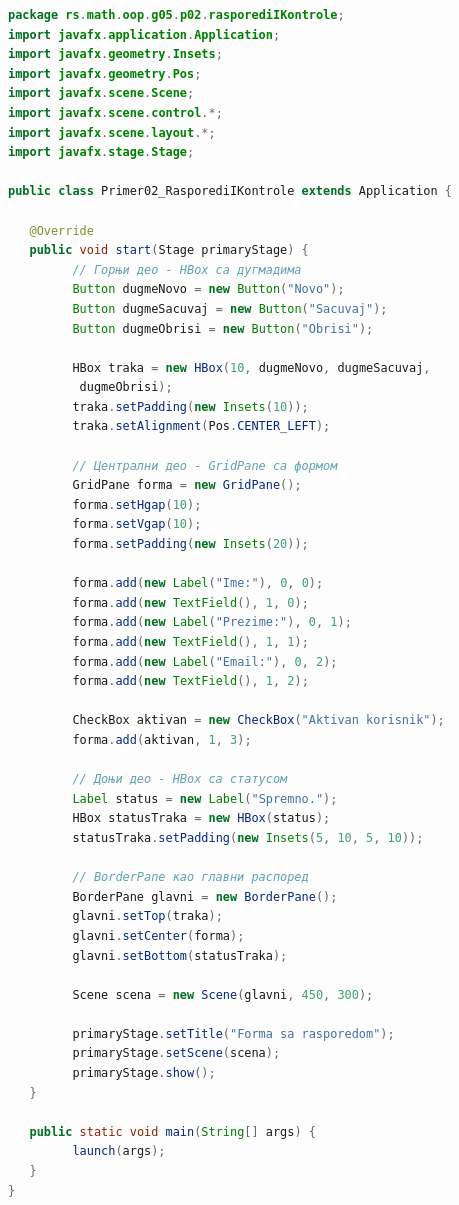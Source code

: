 \begin{lstlisting}[language=Java]
package rs.math.oop.g05.p02.rasporediIKontrole;
import javafx.application.Application;
import javafx.geometry.Insets;
import javafx.geometry.Pos;
import javafx.scene.Scene;
import javafx.scene.control.*;
import javafx.scene.layout.*;
import javafx.stage.Stage;
 
public class Primer02_RasporediIKontrole extends Application {
 
   @Override
   public void start(Stage primaryStage) {
         // Горњи део - HBox са дугмадима
         Button dugmeNovo = new Button("Novo");
         Button dugmeSacuvaj = new Button("Sacuvaj");
         Button dugmeObrisi = new Button("Obrisi");
 
         HBox traka = new HBox(10, dugmeNovo, dugmeSacuvaj,
          dugmeObrisi);
         traka.setPadding(new Insets(10));
         traka.setAlignment(Pos.CENTER_LEFT);
 
         // Централни део - GridPane са формом
         GridPane forma = new GridPane();
         forma.setHgap(10);
         forma.setVgap(10);
         forma.setPadding(new Insets(20));
 
         forma.add(new Label("Ime:"), 0, 0);
         forma.add(new TextField(), 1, 0);
         forma.add(new Label("Prezime:"), 0, 1);
         forma.add(new TextField(), 1, 1);
         forma.add(new Label("Email:"), 0, 2);
         forma.add(new TextField(), 1, 2);
 
         CheckBox aktivan = new CheckBox("Aktivan korisnik");
         forma.add(aktivan, 1, 3);
 
         // Доњи део - HBox са статусом
         Label status = new Label("Spremno.");
         HBox statusTraka = new HBox(status);
         statusTraka.setPadding(new Insets(5, 10, 5, 10));
 
         // BorderPane као главни распоред
         BorderPane glavni = new BorderPane();
         glavni.setTop(traka);
         glavni.setCenter(forma);
         glavni.setBottom(statusTraka);
 
         Scene scena = new Scene(glavni, 450, 300);
 
         primaryStage.setTitle("Forma sa rasporedom");
         primaryStage.setScene(scena);
         primaryStage.show();
   }
 
   public static void main(String[] args) {
         launch(args);
   }
}
\end{lstlisting}


